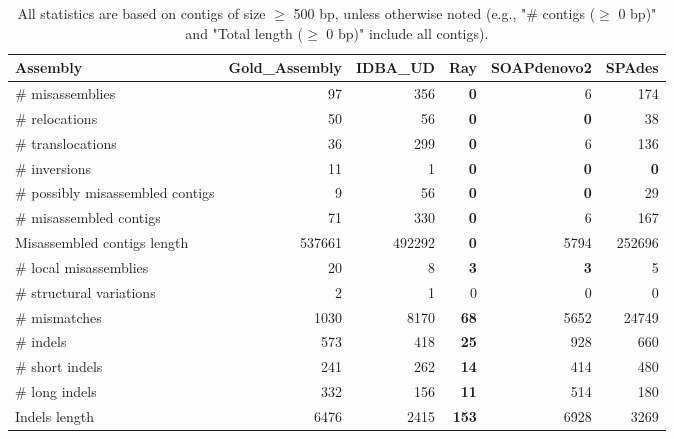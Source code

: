 \documentclass[12pt,a4paper]{article}
\begin{document}
\begin{table}[ht]
\begin{center}
\caption{All statistics are based on contigs of size $\geq$ 500 bp, unless otherwise noted (e.g., "\# contigs ($\geq$ 0 bp)" and "Total length ($\geq$ 0 bp)" include all contigs).}
\begin{tabular}{|l*{5}{|r}|}
\hline
Assembly & Gold\_Assembly & IDBA\_UD & Ray & SOAPdenovo2 & SPAdes \\ \hline
\# misassemblies & 97 & 356 & {\bf 0} & 6 & 174 \\ \hline
\hspace{5mm}\# relocations & 50 & 56 & {\bf 0} & {\bf 0} & 38 \\ \hline
\hspace{5mm}\# translocations & 36 & 299 & {\bf 0} & 6 & 136 \\ \hline
\hspace{5mm}\# inversions & 11 & 1 & {\bf 0} & {\bf 0} & {\bf 0} \\ \hline
\# possibly misassembled contigs & 9 & 56 & {\bf 0} & {\bf 0} & 29 \\ \hline
\# misassembled contigs & 71 & 330 & {\bf 0} & 6 & 167 \\ \hline
Misassembled contigs length & 537661 & 492292 & {\bf 0} & 5794 & 252696 \\ \hline
\# local misassemblies & 20 & 8 & {\bf 3} & {\bf 3} & 5 \\ \hline
\# structural variations & 2 & 1 & 0 & 0 & 0 \\ \hline
\# mismatches & 1030 & 8170 & {\bf 68} & 5652 & 24749 \\ \hline
\# indels & 573 & 418 & {\bf 25} & 928 & 660 \\ \hline
\hspace{5mm}\# short indels & 241 & 262 & {\bf 14} & 414 & 480 \\ \hline
\hspace{5mm}\# long indels & 332 & 156 & {\bf 11} & 514 & 180 \\ \hline
Indels length & 6476 & 2415 & {\bf 153} & 6928 & 3269 \\ \hline
\end{tabular}
\end{center}
\end{table}
\end{document}
